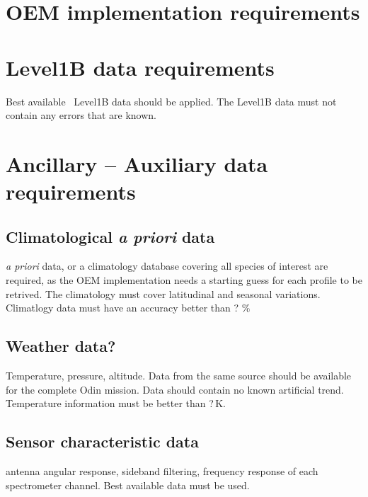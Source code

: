 \section{OEM implementation requirements}


\section{Level1B data requirements}
Best available \smr\ Level1B data should be applied.
The Level1B data must not contain any errors that are known.


\section{Ancillary -- Auxiliary data requirements}
\subsection{Climatological \textit{a priori} data}
\textit{a priori} data, or a climatology database covering all species of interest
are required, as the OEM implementation needs a starting guess for each profile
to be retrived. 
The climatology must cover latitudinal and seasonal variations.
Climatlogy data must have an accuracy better than ? \(\%\)

\subsection{Weather data?}
Temperature, pressure, altitude. Data from the same source
should be available for the complete Odin mission.
Data should contain no known artificial trend.
Temperature information must be better than ?\,K.

\subsection{Sensor characteristic data}  
antenna angular response, sideband filtering,
frequency response of each spectrometer channel.
Best available data must be used.


